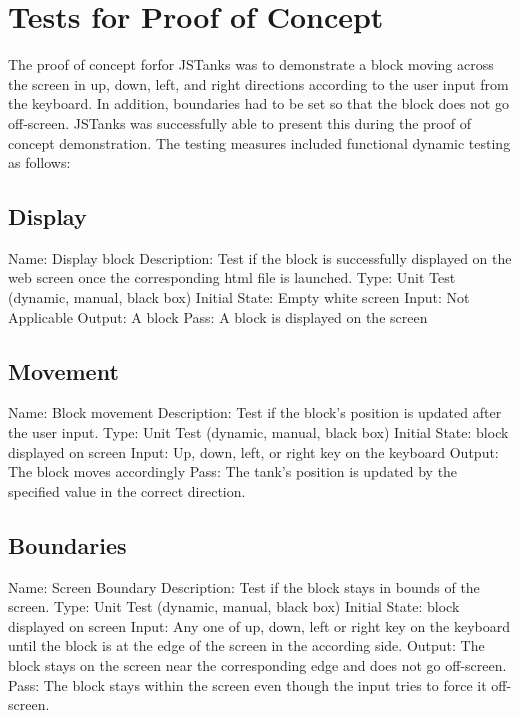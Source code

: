 \documentclass{article}
\begin{document}
\section{Tests for Proof of Concept}
The proof of concept forfor JSTanks was to demonstrate a block moving across the screen in up, down, left, and right directions according to the user input from the keyboard. In addition, boundaries had to be set so that the block does not go off-screen. JSTanks was successfully able to present this during the proof of concept demonstration. The testing measures included functional dynamic testing as follows:
\subsection{Display}
Name: Display block\newline
Description: Test if the block is successfully displayed on the web screen once the corresponding html file is launched.\newline
Type: Unit Test (dynamic, manual, black box)\newline
Initial State: Empty white screen\newline
Input: Not Applicable\newline
Output: A block\newline
Pass: A block is displayed on the screen
\subsection{Movement}
Name: Block movement\newline
Description: Test if the block’s position is updated after the user input.\newline
Type: Unit Test (dynamic, manual, black box)\newline
Initial State: block displayed on screen\newline
Input: Up, down, left, or right key on the keyboard\newline
Output: The block moves accordingly\newline
Pass: The tank’s position is updated by the specified value in the correct direction.
\subsection{Boundaries}
Name: Screen Boundary\newline
Description: Test if the block stays in bounds of the screen.\newline
Type: Unit Test (dynamic, manual, black box)\newline
Initial State: block displayed on screen\newline
Input: Any one of up, down, left or right key on the keyboard until the block is at the edge of the screen in the according side.\newline
Output: The block stays on the screen near the corresponding edge and does not go off-screen.\newline
Pass: The block stays within the screen even though the input tries to force it off-screen.
\end{document}
